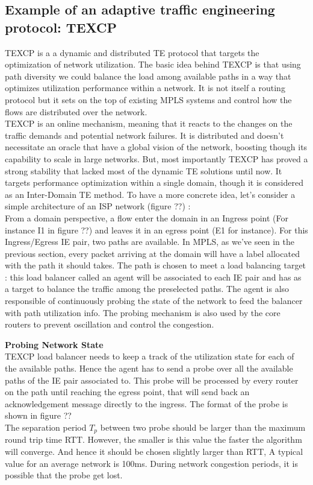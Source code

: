 \subsection{Example of an adaptive traffic engineering protocol: TEXCP }

TEXCP is a a dynamic and distributed TE protocol that targets the optimization of network utilization. The basic idea behind TEXCP is that using path diversity we could balance the load among available paths in a way that optimizes utilization performance within a network. It is not itself a routing protocol but it sets on the top of existing MPLS systems and control how the flows are distributed over the network.
\\ TEXCP is an online mechanism, meaning that it reacts to the changes on the traffic demands and potential network failures. It is distributed and doesn't necessitate an oracle that have a global vision of the network, boosting though its capability to scale in large networks. But, most importantly TEXCP has proved a strong stability that lacked most of the dynamic TE solutions until now. 
It targets performance optimization within a single domain, though it is considered as an Inter-Domain TE method. To have a more concrete idea, let's consider a simple architecture of an ISP network (figure ??) :
\\ From a domain perspective, a flow enter the domain in an Ingress point (For instance I1 in figure ??) and leaves it in an egress point (E1 for instance). For this Ingress/Egress IE pair, two paths are available. In MPLS, as we've seen in the previous section, every packet arriving at the  domain will have a label allocated with the path it should takes. The path is chosen to meet a load balancing target : this load balancer called an agent will be associated to each IE pair and has as a target to balance the traffic among the preselected paths. The agent is also responsible of continuously probing the state of the network to feed the balancer with path utilization info. The probing mechanism is also used by the core routers to prevent oscillation and control the congestion.

{\bf Probing Network State}
\\ TEXCP load balancer needs to keep a track of the utilization state for each of the available paths. Hence the agent has to send a probe over all the available paths of  the IE pair associated to.  This probe will be processed by every router on the path until reaching the egress point, that will send back an acknowledgement message directly to the ingress. The format of the probe is shown in figure ??
\\ The separation period $T_p$ between two probe should be larger than the maximum round trip time RTT. However, the smaller is this value the faster the algorithm will converge. And hence it should be chosen slightly larger than RTT, A typical value for an average network is 100ms. During network congestion periods, it is possible that the probe get lost. \\


